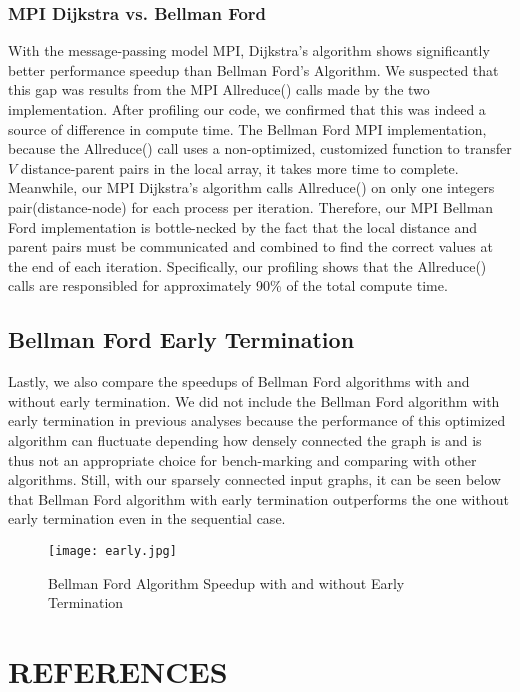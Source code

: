 \documentclass[12pt]{article}
\begin{document}
\subsubsection{MPI Dijkstra vs. Bellman Ford}
With the message-passing model MPI, Dijkstra's algorithm shows significantly better performance speedup than Bellman Ford's Algorithm. We suspected that this gap was results from the MPI Allreduce() calls made by the two implementation. After profiling our code, we confirmed that this was indeed a source of difference in compute time. The Bellman Ford MPI implementation, because the Allreduce() call uses a non-optimized, customized function to transfer $V$ distance-parent pairs in the local array, it takes more time to complete. Meanwhile, our MPI Dijkstra's algorithm calls Allreduce() on only one integers pair(distance-node) for each process per iteration. Therefore, our MPI Bellman Ford implementation is bottle-necked by the fact that the local distance and parent pairs must be communicated and combined to find the correct values at the end of each iteration. Specifically, our profiling shows that the Allreduce() calls are responsibled for approximately 90\% of the total compute time.

\subsection{Bellman Ford Early Termination}
Lastly, we also compare the speedups of Bellman Ford algorithms with and without early termination. We did not include the Bellman Ford algorithm with early termination in previous analyses because the performance of this optimized algorithm can fluctuate depending how densely connected the graph is and is thus not an appropriate choice for bench-marking and comparing with other algorithms. Still, with our sparsely connected input graphs, it can be seen below that Bellman Ford algorithm with early termination outperforms the one without early termination even in the sequential case.

\begin{figure}[h!]
\begin{center}
  \texttt{[image: early.jpg]}
  \caption{Bellman Ford Algorithm Speedup with and without Early Termination}
  \label{fig:wug}
  \end{center}
\end{figure} 

\newpage
\section{REFERENCES}
\printbibliography
\newpage
\end{document}
